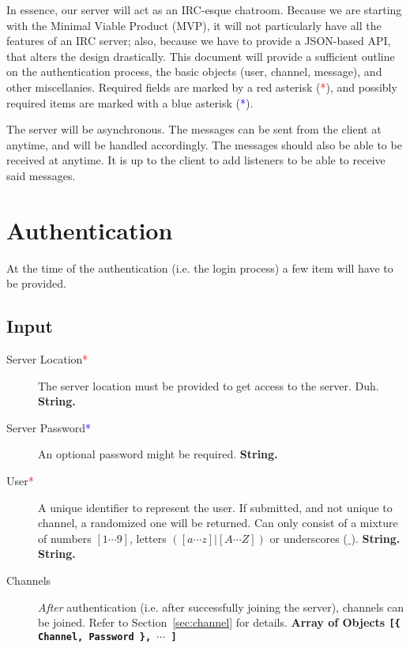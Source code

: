\documentclass[oneside,12pt]{scrbook}
\newcommand{\req}{\textcolor{red}{*}}
\newcommand{\reqalt}{\textcolor{blue}{*}}
\begin{document}


\tableofcontents
\clearpage

In essence, our server will act as an IRC-esque chatroom. Because we are starting with the Minimal Viable Product (MVP), it will not particularly have all the features of an IRC server; also, because we have to provide a JSON-based API, that alters the design drastically. This document will provide a sufficient outline on the authentication process, the basic objects (user, channel, message), and other miscellanies. Required fields are marked by a red asterisk (\req), and possibly required items are marked with a blue asterisk (\reqalt).

The server will be asynchronous. The messages can be sent from the client at anytime, and will be handled accordingly. The messages should also be able to be received at anytime. It is up to the client to add listeners to be able to receive said messages.


\chapter{Authentication}
At the time of the authentication (i.e. the login process) a few item will have to be provided.

\section{Input}
\begin{description}
    \item[Server Location\req] The server location must be provided to get access to the server. Duh. \textbf{String.}
    \item[Server Password\reqalt] An optional password might be required. \textbf{String.}
    \item[User\req] A unique identifier to represent the user. If submitted, and not unique to channel, a randomized one will be returned. Can only consist of a mixture of numbers $[1 \cdots 9]$, letters $([a \cdots z] | [A \cdots Z])$ or underscores ($\_$). \textbf{String.} \textbf{String.}
    \item[Channels] \textit{After} authentication (i.e. after successfully joining the server), channels can be joined. Refer to Section~\ref{sec:channel} for details. \textbf{Array of Objects \texttt{[\{ Channel, Password \}, $\cdots$ ]}}
\end{description}
\end{document}
